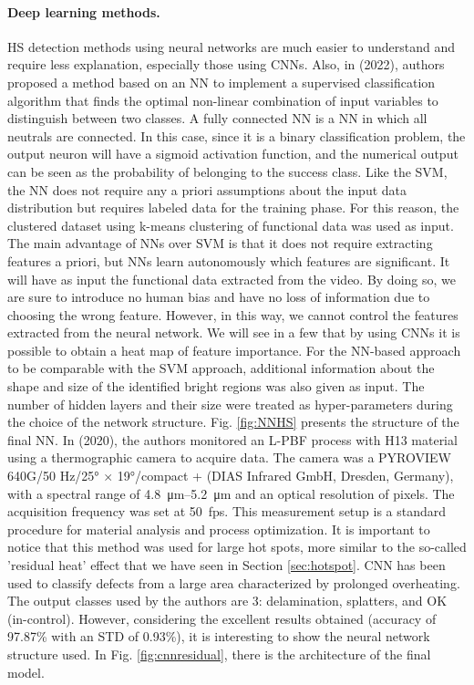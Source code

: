 \paragraph{Deep learning methods.} HS detection methods using neural networks are much easier to understand and require less explanation, especially those using CNNs. Also, in \citeauthor{bugatti_towards_2022} (2022), authors proposed a method based on an NN to implement a supervised classification algorithm that finds the optimal non-linear combination of input variables to distinguish between two classes. A fully connected NN is a NN in which all neutrals are connected. In this case, since it is a binary classification problem, the output neuron will have a sigmoid activation function, and the numerical output can be seen as the probability of belonging to the success class. Like the SVM, the NN does not require any a priori assumptions about the input data distribution but requires labeled data for the training phase. For this reason, the clustered dataset using k-means clustering of functional data was used as input. The main advantage of NNs over SVM is that it does not require extracting features a priori, but NNs learn autonomously which features are significant. It will have as input the functional data extracted from the video. By doing so, we are sure to introduce no human bias and have no loss of information due to choosing the wrong feature. However, in this way, we cannot control the features extracted from the neural network. We will see in a few that by using CNNs it is possible to obtain a heat map of feature importance. For the NN-based approach to be comparable with the SVM approach, additional information about the shape and size of the identified bright regions was also given as input. The number of hidden layers and their size were treated as hyper-parameters during the choice of the network structure. Fig. \ref{fig:NNHS} presents the structure of the final NN. In \citeauthor{baumgartl_deep_2020} (2020), the authors monitored an L-PBF process with H13 material using a thermographic camera to acquire data. The camera was a PYROVIEW 640G/50 Hz/\ang{25} $\times$ \ang{19}/compact + (DIAS Infrared GmbH, Dresden, Germany), with a spectral range of \SIrange{4.8}{5.2}{\micro\metre} and an optical resolution of  pixels. The acquisition frequency was set at \SI{50}{fps}. This measurement setup is a standard procedure for material analysis and process optimization. It is important to notice that this method was used for large hot spots, more similar to the so-called 'residual heat' effect that we have seen in Section \ref{sec:hotspot}. CNN has been used to classify defects from a large area characterized by prolonged overheating. The output classes used by the authors are 3: delamination, splatters, and OK (in-control). However, considering the excellent results obtained (accuracy of 97.87\% with an STD of 0.93\%), it is interesting to show the neural network structure used. In Fig. \ref{fig:cnnresidual}, there is the architecture of the final model.
